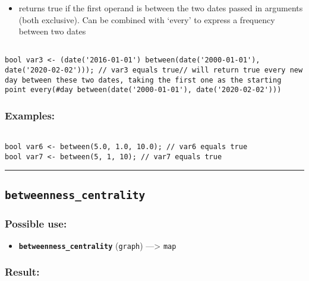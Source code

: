 \documentclass[]{book}
\providecommand{\tightlist}{%
  \setlength{\itemsep}{0pt}\setlength{\parskip}{0pt}}
\theoremstyle{definition}
\theoremstyle{definition}
\theoremstyle{definition}
\theoremstyle{remark}
\begin{document}
\begin{itemize}
\tightlist
\item
  returns true if the first operand is between the two dates passed in
  arguments (both exclusive). Can be combined with `every' to express a
  frequency between two dates
\end{itemize}

\begin{verbatim}
 
bool var3 <- (date('2016-01-01') between(date('2000-01-01'), date('2020-02-02'))); // var3 equals true// will return true every new day between these two dates, taking the first one as the starting point every(#day between(date('2000-01-01'), date('2020-02-02')))  
\end{verbatim}

\subsubsection{Examples:}\label{examples-53}

\begin{verbatim}
 
bool var6 <- between(5.0, 1.0, 10.0); // var6 equals true 
bool var7 <- between(5, 1, 10); // var7 equals true
\end{verbatim}

\begin{center}\rule{0.5\linewidth}{\linethickness}\end{center}

\subsection{\texorpdfstring{\texttt{betweenness\_centrality}}{betweenness\_centrality}}\label{betweenness_centrality}

\subsubsection{Possible use:}\label{possible-use-68}

\begin{itemize}
\tightlist
\item
  \textbf{\texttt{betweenness\_centrality}} (\texttt{graph})
  ---\textgreater{} \texttt{map}
\end{itemize}

\subsubsection{Result:}\label{result-67}
\end{document}
